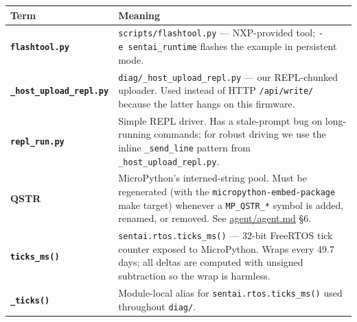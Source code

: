 {\def\LTcaptype{none} %
\begin{longtable}[]{@{}
  >{\raggedright\arraybackslash}p{}
  >{\raggedright\arraybackslash}p{}@{}}
\toprule\noalign{}
\begin{minipage}[b]{\linewidth}\raggedright
Term
\end{minipage} & \begin{minipage}[b]{\linewidth}\raggedright
Meaning
\end{minipage} \\
\midrule\noalign{}
\endhead
\bottomrule\noalign{}
\endlastfoot
\textbf{\texttt{flashtool.py}} & \texttt{scripts/flashtool.py} ---
NXP-provided tool; \texttt{-e\ sentai\_runtime} flashes the example in
persistent mode. \\
\textbf{\texttt{\_host\_upload\_repl.py}} &
\texttt{diag/\_host\_upload\_repl.py} --- our REPL-chunked uploader.
Used instead of HTTP \texttt{/api/write/} because the latter hangs on
this firmware. \\
\textbf{\texttt{repl\_run.py}} & Simple REPL driver. Has a stale-prompt
bug on long-running commands; for robust driving we use the inline
\texttt{\_send\_line} pattern from \texttt{\_host\_upload\_repl.py}. \\
\textbf{QSTR} & MicroPython's interned-string pool. Must be regenerated
(with the \texttt{micropython-embed-package} make target) whenever a
\texttt{MP\_QSTR\_*} symbol is added, renamed, or removed. See
\href{../agent/agent.md}{agent/agent.md} §6. \\
\textbf{\texttt{ticks\_ms()}} & \texttt{sentai.rtos.ticks\_ms()} ---
32-bit FreeRTOS tick counter exposed to MicroPython. Wraps every 49.7
days; all deltas are computed with unsigned subtraction so the wrap is
harmless. \\
\textbf{\texttt{\_ticks()}} & Module-local alias for
\texttt{sentai.rtos.ticks\_ms()} used throughout \texttt{diag/}. \\
\end{longtable}
}
